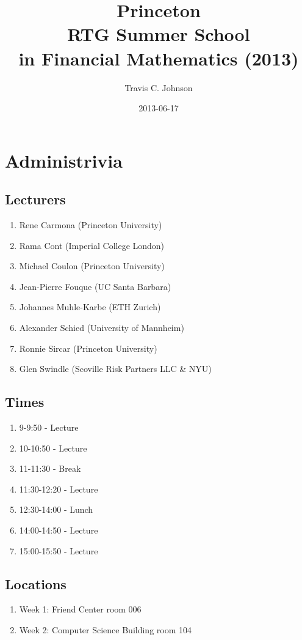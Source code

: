\documentclass[twocolumn,openany]{book}
\title{Princeton \\ RTG Summer School \\in Financial Mathematics (2013)}
\author{ Travis C. Johnson }
\date{2013-06-17}
\begin{document}
\ifpdf
{}
\else
{}
\fi

\maketitle

\chapter{Administrivia}
\section{Lecturers}
\begin{enumerate}
	\item Rene Carmona (Princeton University)
	\item Rama Cont (Imperial College London)
	\item Michael Coulon (Princeton University)
	\item Jean-Pierre Fouque (UC Santa Barbara)
	\item Johannes Muhle-Karbe (ETH Zurich)
	\item Alexander Schied (University of Mannheim)
	\item Ronnie Sircar (Princeton University)
	\item Glen Swindle (Scoville Risk Partners LLC \& NYU)
\end{enumerate}
\section{Times}
\begin{enumerate}
	\item 9-9:50 - Lecture
	\item 10-10:50 - Lecture
	\item 11-11:30 - Break
	\item 11:30-12:20 - Lecture
	\item 12:30-14:00 - Lunch
	\item 14:00-14:50 - Lecture
	\item 15:00-15:50 - Lecture
\end{enumerate}

\section{Locations}
\begin{enumerate}
	\item Week 1: Friend Center room 006
	\item Week 2: Computer Science Building room 104
\end{enumerate}
\end{document}
